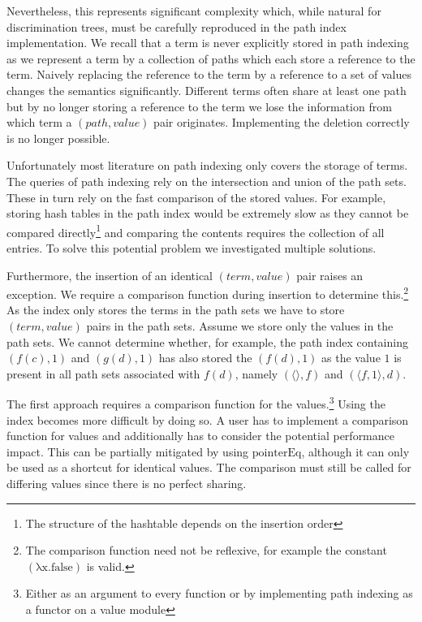 Nevertheless, this represents significant complexity which, while natural for discrimination trees, must be carefully reproduced in the path index implementation. We recall that a term is never explicitly stored in path indexing as we represent a term by a collection of paths which each store a reference to the term. Naively replacing the reference to the term by a reference to a set of values changes the semantics significantly. Different terms often share at least one path but by no longer storing a reference to the term we lose the information from which term a $(path,value)$ pair originates. Implementing the deletion correctly is no longer possible.

Unfortunately most literature on path indexing only covers the storage of terms. The queries of path indexing rely on the intersection and union of the path sets. These in turn rely on the fast comparison of the stored values. For example, storing hash tables in the path index would be extremely slow as they cannot be compared directly\footnote{The structure of the hashtable depends on the insertion order} and comparing the contents requires the collection of all entries. To solve this potential problem we investigated multiple solutions.

Furthermore, the insertion of an identical $(term,value)$ pair raises an exception. We require a comparison function during insertion to determine this.\footnote{The comparison function need not be reflexive, for example the constant $\mathrm{(\lambda x. false)}$ is valid.} As the index only stores the terms in the path sets we have to store $(term,value)$ pairs in the path sets. Assume we store only the values in the path sets. We cannot determine whether, for example, the path index containing $(f(c),1)$ and $(g(d),1)$ has also stored the $(f(d),1)$ as the value $1$ is present in all path sets associated with $f(d)$, namely $(\langle  \rangle,f)$ and $(\langle f,1 \rangle,d)$.

The first approach requires a comparison function for the values.\footnote{Either as an argument to every function or by implementing path indexing as a functor on a value module} Using the index becomes more difficult by doing so. A user has to implement a comparison function for values and additionally has to consider the potential performance impact. This can be partially mitigated by using $\mathrm{pointerEq}$, although it can only be used as a shortcut for identical values. The comparison must still be called for differing values since there is no perfect sharing.

